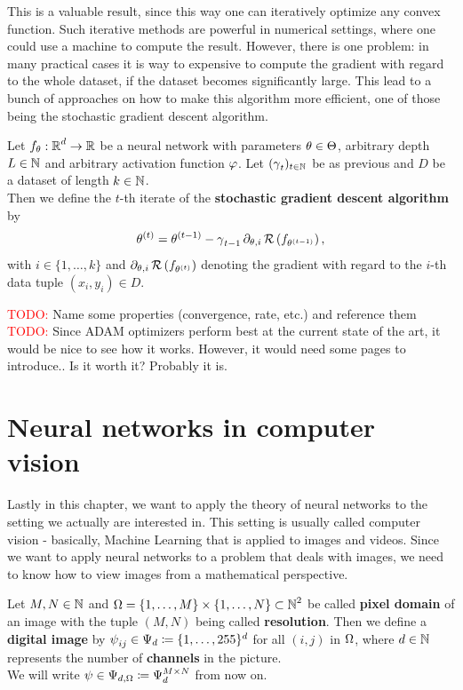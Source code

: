 This is a valuable result, since this way one can iteratively optimize any convex function. Such iterative methods are powerful in numerical settings, where one could use a machine to compute the result. However, there is one problem: in many practical cases it is way to expensive to compute the gradient with regard to the whole dataset, if the dataset becomes significantly large. This lead to a bunch of approaches on how to make this algorithm more efficient, one of those being the stochastic gradient descent algorithm.

\begin{theorem}
Let $f_\theta:\operatorname{\mathbb{R}}^d\to \operatorname{\mathbb{R}}$ be a neural network with parameters $\theta\in\operatorname{\Theta}$, arbitrary depth $L\in\operatorname{\mathbb{N}}$ and arbitrary activation function $\operatorname{\varphi}$. Let $(\operatorname{\gamma}_t)_{t \in \operatorname{\mathbb{N}}}$ be as previous and $D$ be a dataset of length $k\in \operatorname{\mathbb{N}}$.\\
Then we define the $t$-th iterate of the \textbf{stochastic gradient descent algorithm} by
\begin{align}
\theta^{(t)} = \theta^{(t - 1)} - \operatorname{\gamma}_{t-1} \partial_{\theta, i} \operatorname{\mathcal{R}} \left(f_{\theta^{(t - 1)}}\right),
\end{align}
with $i \in \{1,\ldots, k\}$ and $\partial_{\theta, i} \operatorname{\mathcal{R}} \left(f_{\theta^{(t)}}\right)$ denoting the gradient with regard to the $i$-th data tuple $(x_i, y_i) \in D$.
\end{theorem}


\textcolor{red}{TODO:} Name some properties (convergence, rate, etc.) and reference them \\
\textcolor{red}{TODO:} Since ADAM optimizers perform best at the current state of the art, it would be nice to see how it works. However, it would need some pages to introduce.. Is it worth it? Probably it is.

\section{Neural networks in computer vision}

Lastly in this chapter, we want to apply the theory of neural networks to the setting we actually are interested in. This setting is usually called computer vision - basically, Machine Learning that is applied to images and videos. Since we want to apply neural networks to a problem that deals with images, we need to know how to view images from a mathematical perspective.

\begin{definition}\label{def_picture}
Let $M,N\in\operatorname{\mathbb{N}}$ and $\Omega=\{1,\ldots,M\}\times \{1,\ldots,N\} \subset \operatorname{\mathbb{N}}^2$ be called \textbf{pixel domain} of an image with the tuple $(M,N)$ being called \textbf{resolution}. Then we define a \textbf{digital image} by $\operatorname{\psi}_{ij} \in \Psi_d \coloneqq \{1,\ldots,255\}^d$ for all $(i,j)$ in $\Omega$, where $d\in\operatorname{\mathbb{N}}$ represents the number of \textbf{channels} in the picture.\\
We will write $\operatorname{\psi}\in\Psi_{d,\Omega}\coloneqq \Psi_d^{M\times N}$ from now on.
\end{definition}

